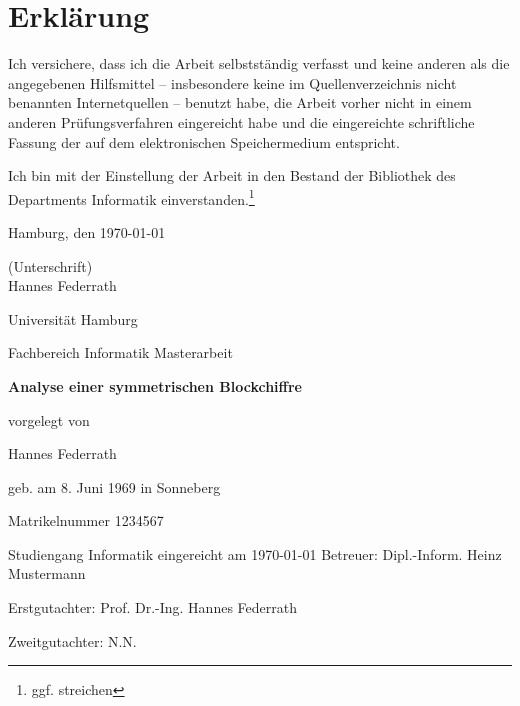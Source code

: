 \documentclass[12pt]{scrartcl}
\begin{document}
\newpage
{}
\section*{Erklärung}
Ich versichere, dass ich die Arbeit selbstständig verfasst und keine anderen als die angegebenen Hilfsmittel -- insbesondere keine im Quellenverzeichnis nicht benannten Internetquellen -- benutzt habe, die Arbeit vorher nicht in einem anderen Prüfungsverfahren eingereicht habe und die eingereichte schriftliche Fassung der auf dem elektronischen Speichermedium entspricht.

Ich bin mit der Einstellung der Arbeit in den Bestand der Bibliothek des Departments Informatik einverstanden.\footnote{ggf. streichen} 

Hamburg, den \today

\bigskip
(Unterschrift)\\
Hannes Federrath


\newpage
\thispagestyle{empty}
\begin{center}\Large
Universität Hamburg \par
Fachbereich Informatik
\vfill
Masterarbeit
\vfill
{\Large\textsf{\textbf{Analyse einer symmetrischen Blockchiffre}}\par}
\vfill
vorgelegt von 
\par\bigskip
Hannes Federrath \par
geb. am 8. Juni 1969 in Sonneberg \par
Matrikelnummer 1234567 \par
Studiengang Informatik
\vfill
eingereicht am \today
\vfill 
Betreuer: Dipl.-Inform. Heinz Mustermann \par
Erstgutachter: Prof. Dr.-Ing. Hannes Federrath \par
Zweitgutachter: N.N.
\end{center}
\end{document}
